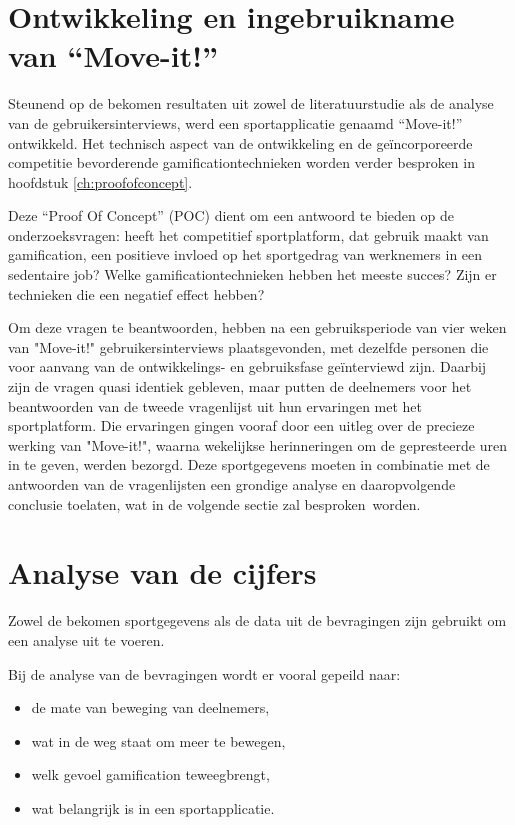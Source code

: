 \section{Ontwikkeling en ingebruikname van ``Move-it!''}

Steunend op de bekomen resultaten uit zowel de literatuurstudie als de analyse van de gebruikersinterviews, werd een sportapplicatie genaamd ``Move-it!'' ontwikkeld. Het technisch aspect van de ontwikkeling en de geïncorporeerde competitie bevorderende gamificationtechnieken worden verder besproken in hoofdstuk \ref{ch:proofofconcept}.

Deze ``Proof Of Concept'' (POC) dient om een antwoord te bieden op de onderzoeksvragen: heeft het competitief sportplatform, dat gebruik maakt van gamification, een positieve invloed op het sportgedrag van werknemers in een sedentaire job? Welke gamificationtechnieken hebben het meeste succes? Zijn er technieken die een negatief effect hebben?

Om deze vragen te beantwoorden, hebben na een gebruiksperiode van vier weken van "Move-it!" gebruikersinterviews plaatsgevonden, met dezelfde personen die voor aanvang van de ontwikkelings- en gebruiksfase geïnterviewd zijn.
Daarbij zijn de vragen quasi identiek gebleven, maar putten de deelnemers voor het beantwoorden van de tweede vragenlijst uit hun ervaringen met het sportplatform. Die ervaringen gingen vooraf door een uitleg over de precieze werking van "Move-it!", waarna wekelijkse herinneringen om de gepresteerde uren in te geven, werden bezorgd. Deze sportgegevens moeten in combinatie met de antwoorden van de vragenlijsten een grondige analyse en daaropvolgende conclusie toelaten, wat in de volgende sectie zal besproken worden.

\section{Analyse van de cijfers}

Zowel de bekomen sportgegevens als de data uit de bevragingen zijn gebruikt om een analyse uit te voeren.

Bij de analyse van de bevragingen wordt er vooral gepeild naar:
\begin{itemize}
    \item de mate van beweging van deelnemers,
    \item wat in de weg staat om meer te bewegen,
    \item welk gevoel gamification teweegbrengt,
    \item wat belangrijk is in een sportapplicatie.
\end{itemize}

